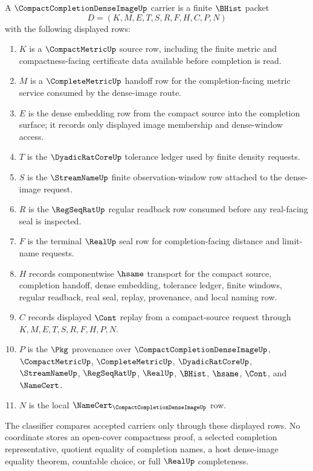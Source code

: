\begin{definition}
\label{def:compact-completion-dense-image-carrier}
A $\CompactCompletionDenseImageUp$ carrier is a finite $\BHist$ packet
$$
D=(K,M,E,T,S,R,F,H,C,P,N)
$$
with the following displayed rows:
\begin{enumerate}
\item $K$ is a $\CompactMetricUp$ source row, including the finite metric and compactness-facing certificate data available before completion is read.
\item $M$ is a $\CompleteMetricUp$ handoff row for the completion-facing metric service consumed by the dense-image route.
\item $E$ is the dense embedding row from the compact source into the completion surface; it records only displayed image membership and dense-window access.
\item $T$ is the $\DyadicRatCoreUp$ tolerance ledger used by finite density requests.
\item $S$ is the $\StreamNameUp$ finite observation-window row attached to the dense-image request.
\item $R$ is the $\RegSeqRatUp$ regular readback row consumed before any real-facing seal is inspected.
\item $F$ is the terminal $\RealUp$ seal row for completion-facing distance and limit-name requests.
\item $H$ records componentwise $\hsame$ transport for the compact source, completion handoff, dense embedding, tolerance ledger, finite windows, regular readback, real seal, replay, provenance, and local naming row.
\item $C$ records displayed $\Cont$ replay from a compact-source request through $K,M,E,T,S,R,F,H,P,N$.
\item $P$ is the $\Pkg$ provenance over $\CompactCompletionDenseImageUp$, $\CompactMetricUp$, $\CompleteMetricUp$, $\DyadicRatCoreUp$, $\StreamNameUp$, $\RegSeqRatUp$, $\RealUp$, $\BHist$, $\hsame$, $\Cont$, and $\NameCert$.
\item $N$ is the local $\NameCert_{\CompactCompletionDenseImageUp}$ row.
\end{enumerate}
The classifier compares accepted carriers only through these displayed rows. No coordinate stores an open-cover compactness proof, a selected completion representative, quotient equality of completion names, a host dense-image equality theorem, countable choice, or full $\RealUp$ completeness.
\end{definition}

